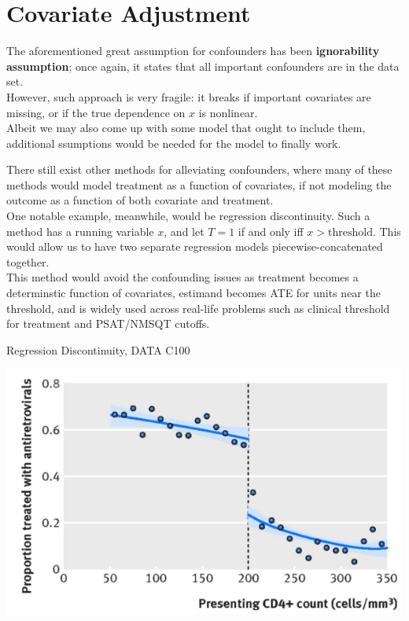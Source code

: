 \section{Covariate Adjustment}
The aforementioned great assumption for confounders has been \textbf{ignorability assumption}; once again, it states that all important confounders are in the data set. \\
However, such approach is very fragile: it breaks if important covariates are missing, or if the true dependence on $x$ is nonlinear. \\
Albeit we may also come up with some model that ought to include them, additional ssumptions would be needed for the model to finally work.

There still exist other methods for alleviating confounders, where many of these methods would model treatment as a function of covariates, if not modeling the outcome as a function of both covariate and treatment. \\
One notable example, meanwhile, would be regression discontinuity. Such a method has a running variable $x$, and let $T = 1$ if and only iff $x > \text{threshold}$. This would allow us to have two separate regression models piecewise-concatenated together. \\
This method would avoid the confounding issues as treatment becomes a determinstic function of covariates, estimand becomes ATE for units near the threshold, and is widely used across real-life problems such as clinical threshold for treatment and PSAT/NMSQT cutoffs.
\begin{ln-fig}{Regression Discontinuity, DATA C100}{}
    \begin{center}
        \includegraphics[scale=0.8]{figs/ln10/reg-discont.png}
    \end{center}
\end{ln-fig}
